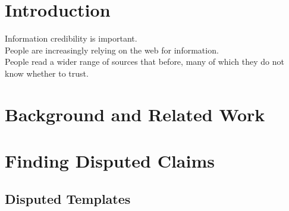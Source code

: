 \documentclass{www2010-submission}
\newcommand{\x}[1]{{\color{blue} #1}\\}
\begin{document}




\section{Introduction}

\x{Information credibility is important.}
\x{People are increasingly relying on the web for information.}
\x{People read a wider range of sources that before, many of which they do not know whether to trust.}

\section{Background and Related Work}




\section{Finding Disputed Claims}

\subsection{Disputed Templates}
\end{document}

